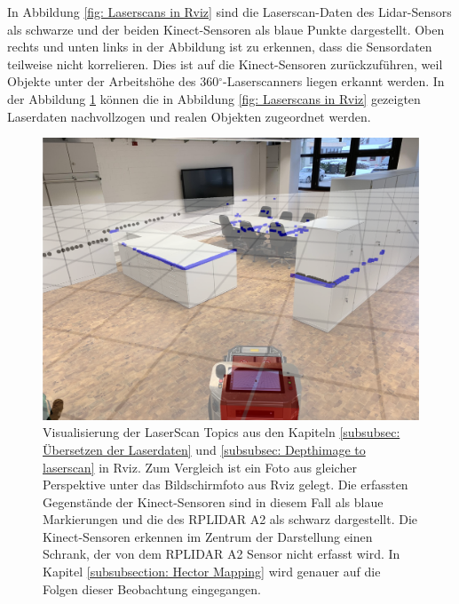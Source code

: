 		     	In Abbildung \ref{fig: Laserscans in Rviz} sind die Laserscan-Daten des Lidar-Sensors als schwarze und der beiden Kinect-Sensoren als blaue Punkte dargestellt. Oben rechts und unten links in der Abbildung ist zu erkennen, dass die Sensordaten teilweise nicht korrelieren. Dies ist auf die Kinect-Sensoren zurückzuführen, weil Objekte unter der Arbeitshöhe des 360$^\circ$-Laserscanners liegen erkannt werden. In der Abbildung \ref{fig: Verifikation der erfassten Laserdaten} können die in Abbildung \ref{fig: Laserscans in Rviz} gezeigten Laserdaten nachvollzogen und realen Objekten zugeordnet werden.
		     	
		     	
		     	\begin{figure}[H]
		     		\centering
		     		\includegraphics[width=1.0\textwidth]{Bilder/match.pdf}
		     		\caption{Visualisierung der LaserScan Topics aus den Kapiteln \ref{subsubsec: Übersetzen der Laserdaten} und \ref{subsubsec: Depthimage to laserscan} in Rviz. Zum Vergleich ist ein Foto aus gleicher Perspektive unter das Bildschirmfoto aus Rviz gelegt. Die erfassten Gegenstände der Kinect-Sensoren sind in diesem Fall als blaue Markierungen und die des RPLIDAR A2 als schwarz dargestellt. Die Kinect-Sensoren erkennen im Zentrum der Darstellung einen Schrank, der von dem RPLIDAR A2 Sensor nicht erfasst wird. In Kapitel \ref{subsubsection: Hector Mapping} wird genauer auf die Folgen dieser Beobachtung eingegangen.}
		     		\label{fig: Verifikation der erfassten Laserdaten}
		     	\end{figure}
		     	
